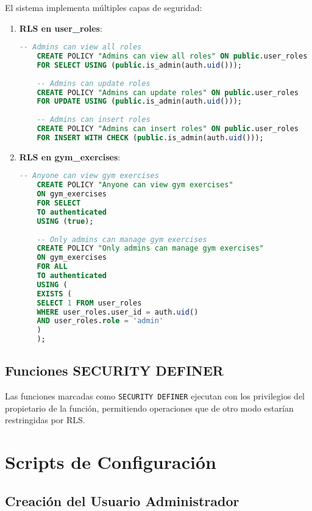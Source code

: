 \documentclass[12pt,a4paper]{article}
\begin{document}
El sistema implementa múltiples capas de seguridad:

\begin{enumerate}
  \item \textbf{RLS en user\_roles}:
  \begin{lstlisting}[language=SQL, caption=Políticas RLS para user\_roles]
    -- Admins can view all roles
    CREATE POLICY "Admins can view all roles" ON public.user_roles
    FOR SELECT USING (public.is_admin(auth.uid()));
    
    -- Admins can update roles
    CREATE POLICY "Admins can update roles" ON public.user_roles
    FOR UPDATE USING (public.is_admin(auth.uid()));
    
    -- Admins can insert roles
    CREATE POLICY "Admins can insert roles" ON public.user_roles
    FOR INSERT WITH CHECK (public.is_admin(auth.uid()));
  \end{lstlisting}
  
  \item \textbf{RLS en gym\_exercises}:
  \begin{lstlisting}[language=SQL, caption=Políticas RLS para gym\_exercises]
    -- Anyone can view gym exercises
    CREATE POLICY "Anyone can view gym exercises"
    ON gym_exercises
    FOR SELECT
    TO authenticated
    USING (true);
    
    -- Only admins can manage gym exercises
    CREATE POLICY "Only admins can manage gym exercises"
    ON gym_exercises
    FOR ALL
    TO authenticated
    USING (
    EXISTS (
    SELECT 1 FROM user_roles
    WHERE user_roles.user_id = auth.uid()
    AND user_roles.role = 'admin'
    )
    );
  \end{lstlisting}
\end{enumerate}

\subsection{Funciones SECURITY DEFINER}

Las funciones marcadas como \texttt{SECURITY DEFINER} ejecutan con los privilegios del propietario de la función, permitiendo operaciones que de otro modo estarían restringidas por RLS.

\section{Scripts de Configuración}

\subsection{Creación del Usuario Administrador}
\end{document}
